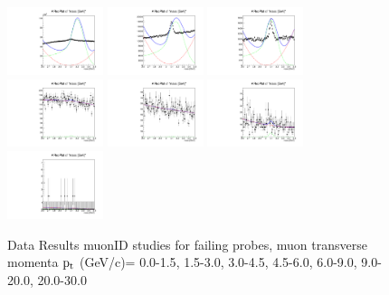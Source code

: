 \documentclass{article}
\begin{document}
\begin{figure}
    \includegraphics[width=0.25\textwidth]{../PlotsRooFitData/croofit_id_fail_0.pdf}
    \includegraphics[width=0.25\textwidth]{../PlotsRooFitData/croofit_id_fail_1.pdf}
    \includegraphics[width=0.25\textwidth]{../PlotsRooFitData/croofit_id_fail_2.pdf}
    \includegraphics[width=0.25\textwidth]{../PlotsRooFitData/croofit_id_fail_3.pdf}
    \includegraphics[width=0.25\textwidth]{../PlotsRooFitData/croofit_id_fail_4.pdf}
    \includegraphics[width=0.25\textwidth]{../PlotsRooFitData/croofit_id_fail_5.pdf}
    \includegraphics[width=0.25\textwidth]{../PlotsRooFitData/croofit_id_fail_6.pdf}
    \caption{Data Results muonID studies for failing probes, muon transverse momenta
    $\rm p_{t}$ (GeV/c)= {0.0-1.5}, {1.5-3.0}, {3.0-4.5}, {4.5-6.0}, 
    {6.0-9.0}, {9.0-20.0}, {20.0-30.0}}
\end{figure}
\end{document}
